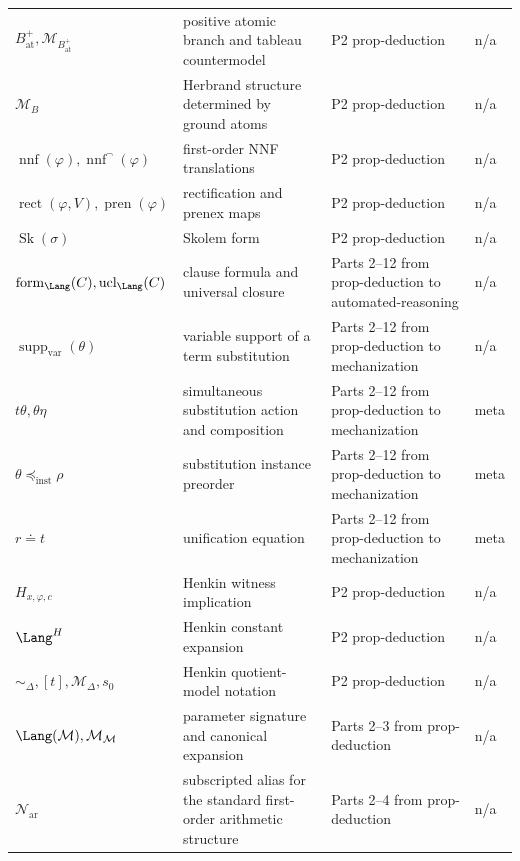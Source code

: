 \begin{longtable}{@{}p{}p{}p{}p{}@{}}
\(B^{+}_{\mathrm{at}},\allowbreak \mathcal M_{B^{+}_{\mathrm{at}}}\) & positive atomic branch and tableau countermodel & P2 prop-\allowbreak{}deduction & n/a \\
\(\mathcal M_B\) & Herbrand structure determined by ground atoms & P2 prop-\allowbreak{}deduction & n/a \\
\(\operatorname{nnf}(\varphi),\allowbreak \operatorname{nnf}^{\neg}(\varphi)\) & first-order NNF translations & P2 prop-\allowbreak{}deduction & n/a \\
\(\operatorname{rect}(\varphi,\allowbreak V),\allowbreak \operatorname{pren}(\varphi)\) & rectification and prenex maps & P2 prop-\allowbreak{}deduction & n/a \\
\(\operatorname{Sk}(\sigma)\) & Skolem form & P2 prop-\allowbreak{}deduction & n/a \\
\(\operatorname{form}_{\Lang}(C),\allowbreak \operatorname{ucl}_{\Lang}(C)\) & clause formula and universal closure & Parts 2--12 from prop-\allowbreak{}deduction to automated-\allowbreak{}reasoning & n/a \\
\(\operatorname{supp}_{\mathrm{var}}(\theta)\) & variable support of a term substitution & Parts 2--12 from prop-\allowbreak{}deduction to mechanization & n/a \\
\(t\theta,\allowbreak \theta\eta\) & simultaneous substitution action and composition & Parts 2--12 from prop-\allowbreak{}deduction to mechanization & meta \\
\(\theta\preceq_{\mathrm{inst}}\rho\) & substitution instance preorder & Parts 2--12 from prop-\allowbreak{}deduction to mechanization & meta \\
\(r\doteq t\) & unification equation & Parts 2--12 from prop-\allowbreak{}deduction to mechanization & meta \\
\(H_{x,\varphi,c}\) & Henkin witness implication & P2 prop-\allowbreak{}deduction & n/a \\
\(\Lang^H\) & Henkin constant expansion & P2 prop-\allowbreak{}deduction & n/a \\
\(\sim_{\Delta},\allowbreak [t],\allowbreak \mathcal M_{\Delta},\allowbreak s_0\) & Henkin quotient-model notation & P2 prop-\allowbreak{}deduction & n/a \\
\(\Lang(\mathcal M),\allowbreak \mathcal M_{\mathcal M}\) & parameter signature and canonical expansion & Parts 2--3 from prop-\allowbreak{}deduction & n/a \\
\(\mathcal N_{\mathrm{ar}}\) & subscripted alias for the standard first-order arithmetic structure & Parts 2--4 from prop-\allowbreak{}deduction & n/a \\

\end{longtable}
